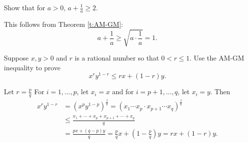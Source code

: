 \documentclass[11pt,dvipsnames]{book}
\numberwithin{equation}{section} %
\numberwithin{figure}{section} %
\numberwithin{table}{section} %
\begin{document}
%
%


\begin{exercise} Show that for $a>0$, $a+\frac{1}{a}\geq 2$. 
\begin{solution}
This follows from Theorem \ref{t:AM-GM}:
\[
a+\frac{1}{a} \geq \sqrt{a\cdot \frac{1}{a}}=1.
\]
\end{solution}
\end{exercise}

\begin{exercise} Suppose $x,y>0$ and $r$ is a rational number so that $0<r\leq 1$. Use the AM-GM inequality to prove 
\[
x^{r}y^{1-r} \leq rx+(1-r)y.
\]
\begin{solution}
Let $r=\frac{p}{q}$ For $i=1,...,p$, let $x_i=x$ and for $i=p+1,...,q$, let $x_i=y$. Then
\begin{align*}
x^{r}y^{1-r} 
& =(x^{p}y^{1-p})^{\frac{1}{q}}
=(x_{1}\cdots x_{p}\cdot x_{p+1}\cdots x_{q} )^{\frac{1}{q}}\\
& \leq \frac{x_{1}+\cdots + x_{p}+x_{p+1}+\cdots + x_{q}}{q} \\
& =\frac{px+(q-p)y}{q}=\frac{p}{q} x+(1-\frac{p}{q})y=rx+(1-r)y.
\end{align*}
\end{solution}

\end{exercise}


\end{document}
